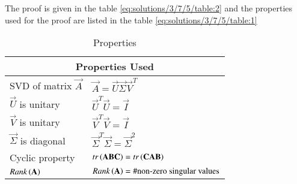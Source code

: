 The proof is given in the table \eqref{eq:solutions/3/7/5/table:2} and the properties used for the proof are listed in the table \eqref{eq:solutions/3/7/5/table:1}
\renewcommand{\thetable}{1}
\begin{table*}[ht!]
\begin{center}
\resizebox{2\columnwidth}{!}
{
\begin{tabular}{|l|l|}
\hline
\multicolumn{2}{|c|}{
\textbf{Properties Used}}\\
\hline
SVD of matrix $\vec{A}$ & $\vec{A}=\vec{U}\vec{\Sigma}\vec{V}^T$\\[0.5ex]
\hline
$\vec{U}$ is unitary & $\vec{U}^T\vec{U}=\vec{I}$\\[0.5ex] 
\hline
$\vec{V}$ is unitary & $\vec{V}^T\vec{V}=\vec{I}$\\[0.5ex] 
\hline
$\vec{\Sigma}$ is diagonal & $\vec{\Sigma}^T\vec{\Sigma}=\vec{\Sigma}^2$\\[0.5ex] 
\hline
Cyclic property & $tr\left(\mathbf{ABC}\right)=tr\left(\mathbf{CAB}\right)$\\[0.5ex] 
\hline
$Rank\left(\mathbf{A}\right)$ & $Rank\left(\mathbf{A}\right)=\# \text{non-zero singular values}$\\[0.5ex] 
\hline
\end{tabular}
}
\end{center}
\caption{Properties}
\label{eq:solutions/3/7/5/table:1}
\end{table*}
\renewcommand{\thetable}{2}
